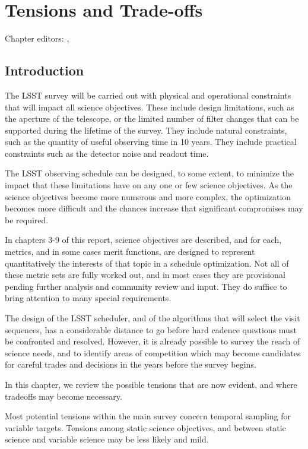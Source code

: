 \chapter[Tensions and Trade-offs]{Tensions and Trade-offs}
\def\chpname{tradeoffs}\label{chp:\chpname}

Chapter editors:
,



\section{Introduction}
	
The LSST survey will be carried out with physical and operational constraints that will impact all science objectives.  These include design limitations, such as the aperture of the telescope, or the limited number of filter changes that can be supported during the lifetime of the survey.  They include natural constraints, such as the quantity of useful observing time in 10 years. They include practical constraints such as the detector noise and readout time.

The LSST observing schedule can be designed, to some extent, to minimize the impact that these limitations have on any one or few science objectives. As the science objectives become more numerous and more complex, the optimization becomes more difficult and the chances increase that significant compromises may be required.

In chapters 3-9 of this report, science objectives are described, and for each, metrics, and in some cases merit functions, are designed to represent quantitatively the interests of that topic in a schedule optimization.  Not all of these metric sets are fully worked out, and in most cases they are provisional pending further analysis and community review and input.  They do suffice to bring attention to many special requirements.

The design of the LSST scheduler, and of the algorithms that will select the visit sequences, has a considerable distance to go before hard cadence questions must be confronted and resolved.  However, it is already possible to survey the reach of science needs, and to identify areas of competition which may become candidates for careful trades and decisions in the years before the survey begins.

In this chapter, we review the possible tensions that are now evident, and where tradeoffs may become necessary.

Most potential tensions within the main survey concern temporal sampling for variable targets.  Tensions among static science objectives, and between static science and variable science may be less likely and mild.  

